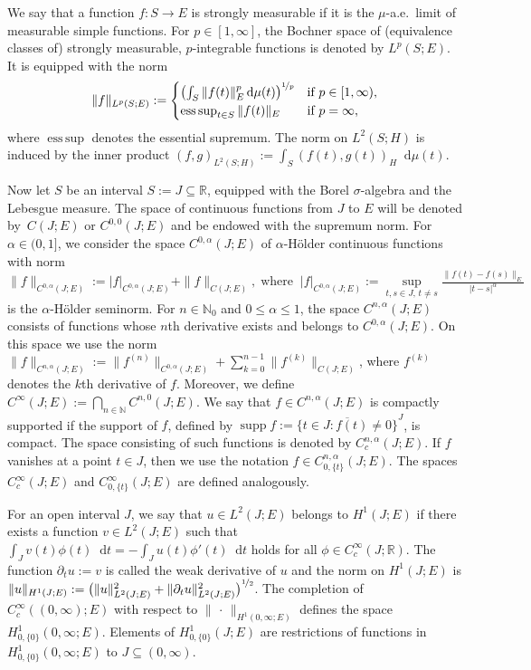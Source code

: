 \documentclass[reqno]{amsart}
\numberwithin{equation}{section}
\newcommand{\R}{\mathbb{R}}
\newcommand{\N}{\mathbb{N}}
\newcommand{\norm}[2]{     \| #1       \|_{ #2 }}
\newcommand{\seminorm}[2]{  | #1        |_{ #2 }}
\newcommand{\rd}{\mathop{}\!\mathrm{d}}
\newcommand{\from}{\colon}
\theoremstyle{remark}
\theoremstyle{definition}
\begin{document}
We say that a function $f \from S \to E$ 
is strongly measurable if it is the $\mu$-a.e.\ limit 
of measurable simple functions. 
For $p \in [1,\infty]$, the Bochner space of 
(equivalence classes of)
strongly measurable, 
$p$-integrable functions is denoted by $L^p(S;E)$. 
It is equipped with the norm 
% 
\[
\norm{f}{L^p(S;E)} 
:= 
\begin{cases} 
\left( \int_S \norm{f(t)}{E}^p \rd \mu(t) \right)^{\nicefrac{1}{p}} 
&\text{if $p \in [1,\infty)$}, \\
\operatorname{ess\,sup}_{t\in S} \norm{f(t)}{E}  
&\text{if $p = \infty$},
\end{cases}  
\]
%
where $\operatorname{ess\,sup}$ 
denotes the essential supremum. 
The norm on $L^2(S;H)$ 
is induced by the inner product 
$(f,g)_{L^2(S;H)} := \int_S (f(t),g(t))_H \rd \mu(t)$. 

Now let $S$ be an interval $S := J \subseteq \R$,  
equipped with the Borel $\sigma$-algebra and the Lebesgue measure. 
The space of continuous functions from $J$ to $E$ 
will be denoted by~$C(J;E)$ or $C^{0,0}(J;E)$ 
and be endowed with the supremum norm. 
For $\alpha\in(0,1]$, we consider the space 
$C^{0,\alpha}(J;E)$ of $\alpha$-H\"older continuous functions 
with norm 
% 
\[
\norm{f}{C^{0,\alpha}(J;E)} 
:= \seminorm{f}{C^{0,\alpha}(J;E)} + \norm{f}{C(J;E)},  
\; \text{where} \;\; 
\seminorm{f}{C^{0,\alpha}(J;E)} 
:= \sup_{ t, s\in J, \, t\neq s } 
\tfrac{\norm{f(t)-f(s)}{E}}{|t-s|^\alpha} 
\]
%
is the $\alpha$-H\"older seminorm. 
For $n \in \N_0$ and $0 \leq \alpha \leq 1$, 
the space $C^{n,\alpha}(J;E)$ 
consists of functions whose $n$th derivative exists 
and belongs to $C^{0,\alpha}(J;E)$. 
On this space we use the norm
%
$\norm{f}{C^{n,\alpha}(J;E)} 
:= 
\norm{f^{(n)}}{C^{0,\alpha}(J;E)} 
+ 
\sum_{k=0}^{n-1} \norm{f^{(k)}}{C(J;E)}$, 
%
where $f^{(k)}$ denotes the $k$th derivative of $f$.
Moreover, we define 
$C^{\infty}(J;E) := \bigcap_{n\in\N} C^{n,0}(J;E)$. 
We say that $f \in C^{n,\alpha}(J;E)$ is 
compactly supported if the support of $f$, 
defined by 
$\operatorname{supp} f := \overline{\{t\in J: f(t)\neq0\}}^J$\!, 
is compact. The space consisting of such functions 
is denoted by $C_c^{n,\alpha}(J;E)$.
If $f$ vanishes at a point $t \in J$, 
then we use the notation ${f \in C^{n,\alpha}_{0,\{t\}}(J;E)}$. 
The spaces $C_c^\infty(J;E)$ 
and $C_{0,\{t\}}^\infty(J;E)$ are defined analogously. 

For an open interval $J$, 
we say that $u \in L^2(J;E)$ belongs to $H^1(J;E)$ 
if there exists a function $v \in L^2(J;E)$ 
such that 
$\int_J v(t) \phi(t)\rd t = -\int_J u(t) \phi'(t)\rd t$ 
holds for all $\phi\in C_c^\infty(J;\R)$. 
The function ${\partial_t u := v}$ 
is called the 
weak derivative of $u$  
and the norm on $H^1(J;E)$ is  
$\norm{u}{H^1(J;E)} 
:= 
\bigl( 
\norm{u}{L^2(J;E)}^2 
+ 
\norm{\partial_t u}{L^2(J;E)}^2 
\bigr)^{\nicefrac{1}{2}}$\!. 
% 
The completion of $C_c^\infty((0,\infty);E)$   
with respect to $\norm{\,\cdot\,}{H^1(0,\infty;E)}$ 
defines the space 
$H^1_{0,\{0\}}(0,\infty;E)$.  
Elements of $H^1_{0,\{0\}}(J;E)$ 
are restrictions of functions in $H^1_{0,\{0\}}(0,\infty;E)$ 
to ${J\subseteq (0,\infty)}$. 
\end{document}

